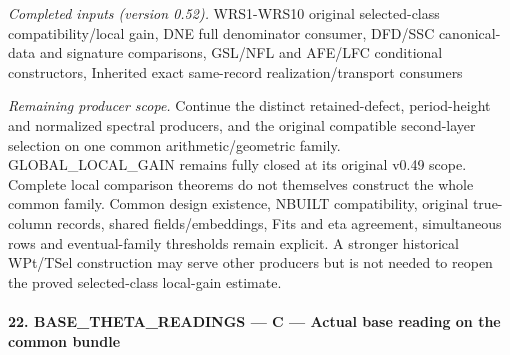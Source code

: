 \emph{Completed inputs (version 0.52).} WRS1-WRS10 original selected-class compatibility/local gain, DNE full denominator consumer, DFD/SSC canonical-data and signature comparisons, GSL/NFL and AFE/LFC conditional constructors, Inherited exact same-record realization/transport consumers

\emph{Remaining producer scope.} Continue the distinct retained-defect, period-height and normalized spectral producers, and the original compatible second-layer selection on one common arithmetic/geometric family. GLOBAL\_\allowbreak LOCAL\_\allowbreak GAIN remains fully closed at its original v0.49 scope. Complete local comparison theorems do not themselves construct the whole common family. Common design existence, NBUILT compatibility, original true-column records, shared fields/embeddings, Fits and eta agreement, simultaneous rows and eventual-family thresholds remain explicit. A stronger historical WPt/TSel construction may serve other producers but is not needed to reopen the proved selected-class local-gain estimate.



\paragraph{22. BASE\_\allowbreak THETA\_\allowbreak READINGS — C — Actual base reading on the common bundle}

